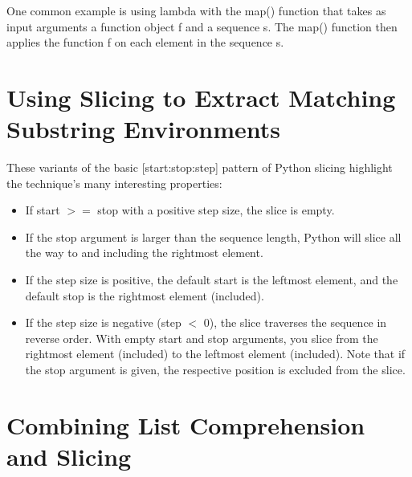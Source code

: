 One common example is using lambda with the map() function that takes as input arguments a function object f and a sequence s. The map() function then applies the function f on each element in the sequence s.
\section{Using Slicing to Extract Matching Substring Environments}

These variants of the basic \textsf{[start:stop:step]} pattern of Python slicing
highlight the technique’s many interesting properties:
\begin{itemize}
    \item If start $>=$ stop with a positive step size, the slice is empty.
    \item If the stop argument is larger than the sequence length, Python will slice all the way to and including the rightmost element.
    \item If the step size is positive, the default start is the leftmost element, and the default stop is the rightmost element (included).
    \item If the step size is negative (step $<$ 0), the slice traverses the sequence in reverse order. With empty start and stop arguments, you slice from the rightmost element (included) to the leftmost element (included). Note that if the stop argument is given, the respective position is excluded from the slice.
\end{itemize}

\section{Combining List Comprehension and Slicing}
